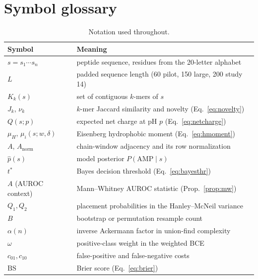 
\section{Symbol glossary}\label{app:symbols}
\begin{table}[h]\centering\small
\caption{Notation used throughout.}
\label{tab:symbols}
\begin{tabular}{ll}
\hline
Symbol & Meaning \\
\hline
$s = s_1\cdots s_n$ & peptide sequence, residues from the 20-letter alphabet \\
$L$ & padded sequence length (60 pilot, 150 large, 200 study 14) \\
$K_k(s)$ & set of contiguous $k$-mers of $s$ \\
$J_k$, $\nu_k$ & $k$-mer Jaccard similarity and novelty (Eq.~\eqref{eq:novelty}) \\
$Q(s;p)$ & expected net charge at pH $p$ (Eq.~\eqref{eq:netcharge}) \\
$\mu_H$, $\mu_i(s;w,\delta)$ & Eisenberg hydrophobic moment (Eq.~\eqref{eq:hmoment}) \\
$A$, $A_{\mathrm{norm}}$ & chain-window adjacency and its row normalization \\
$\hat p(s)$ & model posterior $P(\mathrm{AMP}\mid s)$ \\
$t^{*}$ & Bayes decision threshold (Eq.~\eqref{eq:bayesthr}) \\
$A$ (AUROC context) & Mann--Whitney AUROC statistic (Prop.~\ref{prop:mw}) \\
$Q_1, Q_2$ & placement probabilities in the Hanley--McNeil variance \\
$B$ & bootstrap or permutation resample count \\
$\alpha(n)$ & inverse Ackermann factor in union-find complexity \\
$\omega$ & positive-class weight in the weighted BCE \\
$c_{01}, c_{10}$ & false-positive and false-negative costs \\
$\mathrm{BS}$ & Brier score (Eq.~\eqref{eq:brier}) \\
\hline
\end{tabular}
\end{table}
